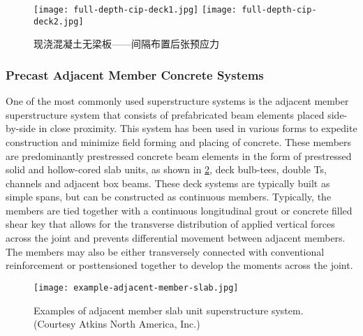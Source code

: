 \begin{figure}
  \texttt{[image: full-depth-cip-deck1.jpg]}\hfill
  \texttt{[image: full-depth-cip-deck2.jpg]}
  \caption{现浇混凝土无梁板——间隔布置后张预应力}
  \label{fig:full-depth-cip-deck}
\end{figure}

\subsubsection{Precast Adjacent Member Concrete Systems}
One of the most commonly used superstructure systems is the adjacent member superstructure system that consists of prefabricated beam elements placed side-by-side in close proximity. This system has been used in various forms to expedite construction and minimize field forming and placing of concrete. These members are predominantly prestressed concrete beam elements in the form of prestressed solid and hollow-cored slab units, as shown in \cref{fig:example-adjacent-member-slab}, deck bulb-tees, double Ts, channels and adjacent box beams. These deck systems are typically built as simple spans, but can be constructed as continuous members. Typically, the members are tied together with a continuous longitudinal grout or concrete filled shear key that allows for the transverse distribution of applied vertical forces across the joint and prevents differential movement between adjacent members. The members may also be either transversely connected with conventional reinforcement or posttensioned together to develop the moments across the joint.

\begin{figure}
  \texttt{[image: example-adjacent-member-slab.jpg]}
  \caption{Examples of adjacent member slab unit superstructure system. (Courtesy Atkins North America, Inc.)}
  \label{fig:example-adjacent-member-slab}
\end{figure}

